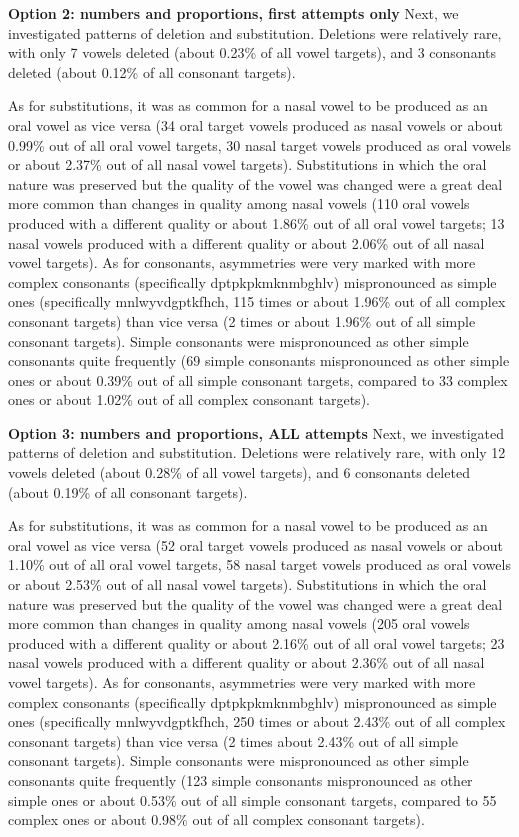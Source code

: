 \documentclass[english,,man,floatsintext]{apa6}
\begin{document}
\textbf{Option 2: numbers and proportions, first attempts only} Next, we
investigated patterns of deletion and substitution. Deletions were
relatively rare, with only 7 vowels deleted (about 0.23\% of all vowel
targets), and 3 consonants deleted (about 0.12\% of all consonant
targets).

As for substitutions, it was as common for a nasal vowel to be produced
as an oral vowel as vice versa (34 oral target vowels produced as nasal
vowels or about 0.99\% out of all oral vowel targets, 30 nasal target
vowels produced as oral vowels or about 2.37\% out of all nasal vowel
targets). Substitutions in which the oral nature was preserved but the
quality of the vowel was changed were a great deal more common than
changes in quality among nasal vowels (110 oral vowels produced with a
different quality or about 1.86\% out of all oral vowel targets; 13
nasal vowels produced with a different quality or about 2.06\% out of
all nasal vowel targets). As for consonants, asymmetries were very
marked with more complex consonants (specifically dptpkpkmknmbghlv)
mispronounced as simple ones (specifically mnlwyvdgptkfhch, 115 times or
about 1.96\% out of all complex consonant targets) than vice versa (2
times or about 1.96\% out of all simple consonant targets). Simple
consonants were mispronounced as other simple consonants quite
frequently (69 simple consonants mispronounced as other simple ones or
about 0.39\% out of all simple consonant targets, compared to 33 complex
ones or about 1.02\% out of all complex consonant targets).

\textbf{Option 3: numbers and proportions, ALL attempts} Next, we
investigated patterns of deletion and substitution. Deletions were
relatively rare, with only 12 vowels deleted (about 0.28\% of all vowel
targets), and 6 consonants deleted (about 0.19\% of all consonant
targets).

As for substitutions, it was as common for a nasal vowel to be produced
as an oral vowel as vice versa (52 oral target vowels produced as nasal
vowels or about 1.10\% out of all oral vowel targets, 58 nasal target
vowels produced as oral vowels or about 2.53\% out of all nasal vowel
targets). Substitutions in which the oral nature was preserved but the
quality of the vowel was changed were a great deal more common than
changes in quality among nasal vowels (205 oral vowels produced with a
different quality or about 2.16\% out of all oral vowel targets; 23
nasal vowels produced with a different quality or about 2.36\% out of
all nasal vowel targets). As for consonants, asymmetries were very
marked with more complex consonants (specifically dptpkpkmknmbghlv)
mispronounced as simple ones (specifically mnlwyvdgptkfhch, 250 times or
about 2.43\% out of all complex consonant targets) than vice versa (2
times about 2.43\% out of all simple consonant targets). Simple
consonants were mispronounced as other simple consonants quite
frequently (123 simple consonants mispronounced as other simple ones or
about 0.53\% out of all simple consonant targets, compared to 55 complex
ones or about 0.98\% out of all complex consonant targets).
\end{document}
